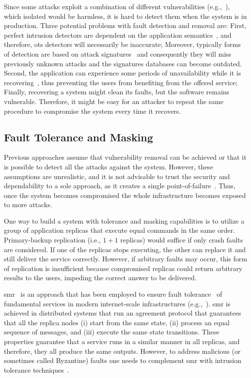 Since some attacks exploit a combination of different vulnerabilities (e.g.,~\cite{stuxnet:2010}), which isolated would be harmless, it is hard to detect them when the system is in production.
Three potential problems with fault detection and removal are: 
First, perfect intrusion detectors are dependent on the application semantics~\cite{Doudou:1999}, and therefore, \gls{ots} detectors will necessarily be inaccurate; 
Moreover, typically forms of detection are based on attack signatures~\cite{Sommer:2010} and consequently they will miss previously unknown attacks and the signatures databases can become outdated.
Second, the application can experience some periods of unavailability while it is recovering~\cite{Wilfredo:2000}, thus preventing the users from benefiting from the offered service; 
Finally, recovering a system might clean its faults, but the software remains vulnerable.
Therefore, it might be easy for an attacker to repeat the same procedure to compromise the system every time it recovers.


\subsection{Fault Tolerance and Masking}
Previous approaches assume that vulnerability removal can be achieved or that it is possible to detect all the attacks against the system.
However, these assumptions are unrealistic, and it is not advisable to trust the security and dependability to a sole approach, as it creates a single point-of-failure~\cite{Verissimo:2003}. 
Thus, once the system becomes compromised the whole infrastructure becomes exposed to more attacks. 

One way to build a system with tolerance and masking capabilities is to utilize a group of application replicas that execute equal commands in the same order. 
Primary-backup replication (i.e., $1 + 1$ replicas) would suffice if only crash faults are considered. 
If one of the replicas stops executing, the other can replace it and still deliver the service correctly.
However, if arbitrary faults may occur, this form of replication is insufficient because compromised replicas could return arbitrary results to the users, impeding the correct answer to be delivered.

\gls{smr}~\cite{Lamport:1979} is an approach that has been employed to ensure fault tolerance~\cite{Schneider:1990} of fundamental services in modern internet-scale infrastructures (e.g.,~\cite{Hunt:2010,Calder:2011,Corbett:2013}).
\gls{smr} is achieved in distributed systems that run an agreement protocol that guarantees that all the replica nodes (i) start from the same state, (ii) process an equal sequence of messages, and (iii) execute the same state transitions. 
These properties guarantee that a service runs in a similar manner in all replicas, and therefore, they all produce the same outputs.
However, to address malicious (or sometimes called Byzantine) faults one needs to complement \gls{smr} with intrusion tolerance techniques~\cite{Verissimo:2003}.

